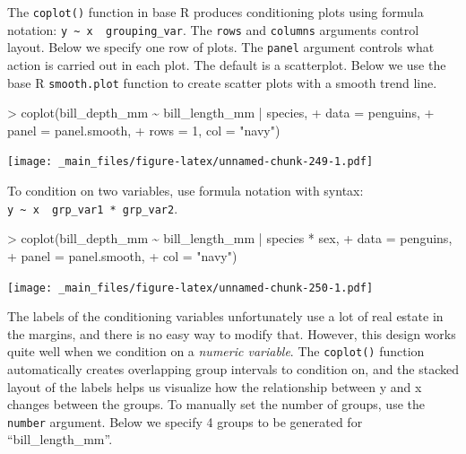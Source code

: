 \documentclass[
]{book}
\newenvironment{Shaded}{\begin{snugshade}}{\end{snugshade}}
\newcommand{\AttributeTok}[1]{\textcolor[rgb]{0.77,0.63,0.00}{#1}}
\newcommand{\DecValTok}[1]{\textcolor[rgb]{0.00,0.00,0.81}{#1}}
\newcommand{\FunctionTok}[1]{\textcolor[rgb]{0.00,0.00,0.00}{#1}}
\newcommand{\NormalTok}[1]{#1}
\newcommand{\SpecialCharTok}[1]{\textcolor[rgb]{0.00,0.00,0.00}{#1}}
\newcommand{\StringTok}[1]{\textcolor[rgb]{0.31,0.60,0.02}{#1}}
\begin{document}
The \texttt{coplot()} function in base R produces conditioning plots using formula notation: \texttt{y\ \textasciitilde{}\ x\ \textbar{}\ grouping\_var}. The \texttt{rows} and \texttt{columns} arguments control layout. Below we specify one row of plots. The \texttt{panel} argument controls what action is carried out in each plot. The default is a scatterplot. Below we use the base R \texttt{smooth.plot} function to create scatter plots with a smooth trend line.

\begin{Shaded}
\begin{Highlighting}[]
\SpecialCharTok{\textgreater{}} \FunctionTok{coplot}\NormalTok{(bill\_depth\_mm }\SpecialCharTok{\textasciitilde{}}\NormalTok{ bill\_length\_mm }\SpecialCharTok{|}\NormalTok{ species, }
\SpecialCharTok{+}        \AttributeTok{data =}\NormalTok{ penguins,}
\SpecialCharTok{+}        \AttributeTok{panel =}\NormalTok{ panel.smooth,}
\SpecialCharTok{+}        \AttributeTok{rows =} \DecValTok{1}\NormalTok{, }\AttributeTok{col =} \StringTok{"navy"}\NormalTok{)}
\end{Highlighting}
\end{Shaded}

\texttt{[image: \_main\_files/figure-latex/unnamed-chunk-249-1.pdf]}

To condition on two variables, use formula notation with syntax: \texttt{y\ \textasciitilde{}\ x\ \textbar{}\ grp\_var1\ *\ grp\_var2}.

\begin{Shaded}
\begin{Highlighting}[]
\SpecialCharTok{\textgreater{}} \FunctionTok{coplot}\NormalTok{(bill\_depth\_mm }\SpecialCharTok{\textasciitilde{}}\NormalTok{ bill\_length\_mm }\SpecialCharTok{|}\NormalTok{ species }\SpecialCharTok{*}\NormalTok{ sex, }
\SpecialCharTok{+}        \AttributeTok{data =}\NormalTok{ penguins,}
\SpecialCharTok{+}        \AttributeTok{panel =}\NormalTok{ panel.smooth,}
\SpecialCharTok{+}        \AttributeTok{col =} \StringTok{"navy"}\NormalTok{)}
\end{Highlighting}
\end{Shaded}

\texttt{[image: \_main\_files/figure-latex/unnamed-chunk-250-1.pdf]}

The labels of the conditioning variables unfortunately use a lot of real estate in the margins, and there is no easy way to modify that. However, this design works quite well when we condition on a \emph{numeric variable}. The \texttt{coplot()} function automatically creates overlapping group intervals to condition on, and the stacked layout of the labels helps us visualize how the relationship between y and x changes between the groups. To manually set the number of groups, use the \texttt{number} argument. Below we specify 4 groups to be generated for ``bill\_length\_mm''.
\end{document}
